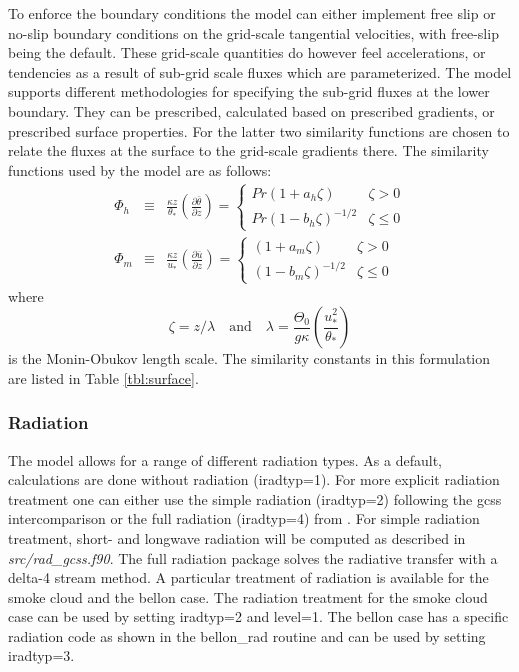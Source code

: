 \documentclass[11pt,a4paper]{article}
\begin{document}
To enforce the boundary conditions the model can either implement free
slip or no-slip boundary conditions on the grid-scale tangential
velocities, with free-slip being the default.  These grid-scale
quantities do however feel accelerations, or tendencies as a result of
sub-grid scale fluxes which are parameterized.  The model supports
different methodologies for specifying the sub-grid fluxes at the
lower boundary.  They can be prescribed, calculated based on
prescribed gradients, or prescribed surface properties.  For the
latter two similarity functions are chosen to relate the fluxes at the
surface to the grid-scale gradients there.  The similarity functions
used by the model are as follows:
\begin{eqnarray*}
\Phi_h & \equiv &\frac{\kappa z}{\theta_*} \left(\frac{\partial
\bar{\theta}}{\partial z}\right) = \begin{cases} Pr(1+a_h\zeta) &
\zeta > 0 \\ Pr(1-b_h\zeta)^{-1/2} & \zeta \le 0 \end{cases} \\ \Phi_m
& \equiv & \frac{\kappa z}{u_*} \left( \frac{\partial
\bar{u}}{\partial z} \right) = \begin{cases} (1+a_m\zeta) & \zeta > 0
\\ (1-b_m\zeta)^{-1/2} & \zeta \le 0 \end{cases}
\end{eqnarray*}
where
\[ \zeta = z/\lambda \quad \text{and} \quad \lambda =
\frac{\Theta_0}{g\kappa} \left(\frac{u_*^2}{\theta_*}\right) \] is the
Monin-Obukov length scale.  The similarity constants in this
formulation are listed in Table \ref{tbl:surface}.

\subsubsection{Radiation}
The model allows for a range of different radiation types.
As a default, calculations are done without
radiation (iradtyp=1). For more explicit radiation treatment one can either use
the simple radiation (iradtyp=2) following the gcss intercomparison or
the full radiation (iradtyp=4) from \cite{Pincus:2009}.
For simple radiation treatment, short- and longwave
radiation will be computed as described in \emph{src/rad\_gcss.f90}.
The full radiation package solves the radiative transfer with a delta-4 stream method.
A particular treatment
of radiation is available for the smoke cloud and the bellon
case. The radiation treatment for the smoke cloud case can be
used by setting iradtyp=2 and level=1. The bellon case has a
specific radiation code as shown in the bellon\_rad routine
and can be used by setting iradtyp=3.
\end{document}
